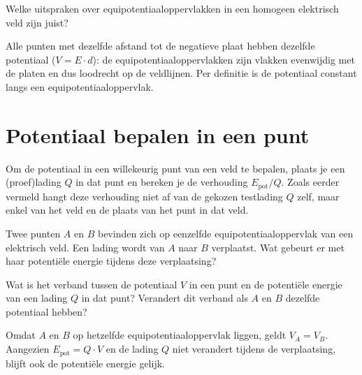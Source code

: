 \documentclass{ximera}
\begin{document}
\begin{question}
    Welke uitspraken over equipotentiaaloppervlakken in een homogeen elektrisch veld zijn juist?

    \begin{selectAll}
    \end{selectAll}

    \begin{solution}\nl
        Alle punten met dezelfde afstand tot de negatieve plaat hebben dezelfde potentiaal ($V = E \cdot d$): de equipotentiaaloppervlakken zijn vlakken evenwijdig met de platen en dus loodrecht op de veldlijnen. Per definitie is de potentiaal constant langs een equipotentiaaloppervlak.
    \end{solution}
\end{question}

\section{Potentiaal bepalen in een punt}
Om de potentiaal in een willekeurig punt van een veld te bepalen, plaats je een (proef)lading $Q$ in dat punt en bereken je de verhouding $E_{\text{pot}}/Q$. Zoals eerder vermeld hangt deze verhouding niet af van de gekozen testlading $Q$ zelf, maar enkel van het veld en de plaats van het punt in dat veld.

\begin{question}
    Twee punten $A$ en $B$ bevinden zich op eenzelfde equipotentiaaloppervlak van een elektrisch veld. Een lading wordt van $A$ naar $B$ verplaatst. Wat gebeurt er met haar potentiële energie tijdens deze verplaatsing?

    \begin{multipleChoice}
    \end{multipleChoice}

    \begin{hint}
        Wat is het verband tussen de potentiaal $V$ in een punt en de potentiële energie van een lading $Q$ in dat punt? Verandert dit verband als $A$ en $B$ dezelfde potentiaal hebben?
    \end{hint}

    \begin{solution}\nl
        Omdat $A$ en $B$ op hetzelfde equipotentiaaloppervlak liggen, geldt $V_A = V_B$. Aangezien $E_{\text{pot}} = Q \cdot V$ en de lading $Q$ niet verandert tijdens de verplaatsing, blijft ook de potentiële energie gelijk.
    \end{solution}
\end{question}
\end{document}
